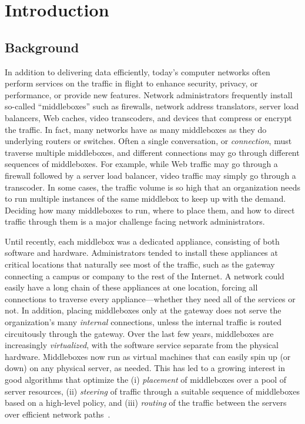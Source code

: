 
\section{Introduction}
\label{sec:intro}
\subsection{Background}
In addition to delivering data efficiently, today's computer networks often perform services on the traffic in flight to enhance security, privacy, or performance, or provide new features.  Network administrators frequently install so-called ``middleboxes'' such as firewalls, network address translators, server load balancers, Web caches, video transcoders, and devices that compress or encrypt the traffic.  In fact, many networks have as many middleboxes as they do underlying routers or switches.  Often a single conversation, or \emph{connection}, must traverse multiple middleboxes, and different connections may go through different sequences of middleboxes.  For example, while Web traffic may go through a firewall followed by a server load balancer, video traffic may simply go through a transcoder.  In some cases, the traffic volume is so high that an organization needs to run multiple instances of the same middlebox to keep up with the demand.  Deciding how many middleboxes to run, where to place them, and how to direct traffic through them is a major challenge facing network administrators.

Until recently, each middlebox was a dedicated appliance, consisting of both software and hardware.  Administrators tended to install these appliances at critical locations that naturally see most of the traffic, such as the gateway connecting a campus or company to the rest of the Internet.  A network could easily have a long chain of these appliances at one location, forcing all connections to traverse every appliance---whether they need all of the services or not.  In addition, placing middleboxes only at the gateway does not serve the organization's many \emph{internal} connections, unless the internal traffic is routed circuitously through the gateway.
%
Over the last few years, middleboxes are increasingly \emph{virtualized}, with the software service separate from the physical hardware.  Middleboxes now run as virtual machines that can easily spin up (or down) on any physical server, as needed.  This has led to a growing interest in good algorithms that optimize the (i) \emph{placement} of middleboxes over a pool of server resources, (ii) \emph{steering} of traffic through a suitable sequence of middleboxes based on a high-level policy, and (iii) \emph{routing} of the traffic between the servers over efficient network paths~\cite{SIMPLE2013}.

